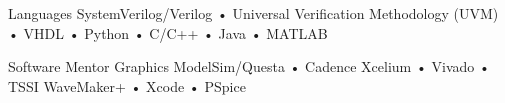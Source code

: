 


\begin{cvskills}


\cvskill
{Languages} %
{SystemVerilog/Verilog • Universal Verification Methodology (UVM) • VHDL • Python • C/C++ • Java • MATLAB} %


\cvskill
{Software} %
{Mentor Graphics ModelSim/Questa • Cadence Xcelium • Vivado • TSSI WaveMaker+ • Xcode • PSpice} %



\end{cvskills}